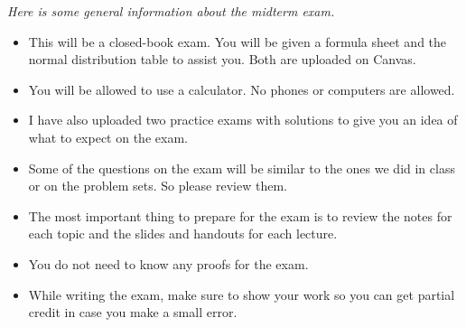 \documentclass{./../../Latex/handout}
\begin{document}
\thispagestyle{plain}
\textit{Here is some general information about the midterm exam.}

\begin{itemize}
\item This will be a closed-book exam. You will be given a formula sheet and the normal distribution table to assist you. Both are uploaded on Canvas.
\item You will be allowed to use a calculator. No phones or computers are allowed. 
\item I have also uploaded two practice exams with solutions to give you an idea of what to expect on the exam. 
\item Some of the questions on the exam will be similar to the ones we did in class or on the problem sets. So please review them.
\item The most important thing to prepare for the exam is to review the notes for each topic and the slides and handouts for each lecture. 
\item You do not need to know any proofs for the exam.
\item While writing the exam, make sure to show your work so you can get partial credit in case you make a small error.  
\end{itemize}
\end{document}
